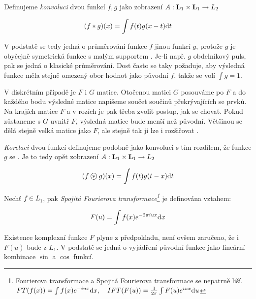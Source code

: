 Definujeme {\em konvoluci} dvou funkcí $f,g$ jako zobrazení $A: \mathbf{L}_1\times\mathbf{L}_1\rightarrow L_2$

\begin{equation}
(f\ast g)(x)=\int f(t)g(x-t){\rm d} t
\end{equation}

V podstatě se tedy jedná o průměrování funkce $f$ jinou funkcí $g$, protože $g$ je obyčejně symetrická funkce s
malým supportem . Je-li např. $g$ obdelníkový puls, pak se jedná o klasické průměrování. Dost 
často se taky požaduje, aby výsledná funkce měla stejně omezený obor hodnot jako původní $f$, takže se volí $\int g=1$.

V diskrétním případě je $F$ i $G$ matice. Otočenou matici $G$ posouváme po $F$ a do každého bodu výsledné matice
napíšeme součet součinů překrývajících se prvků. Na krajích matice $F$ a v rozích je pak třeba zvolit postup, jak se chovat.
Pokud zůstaneme s $G$ uvnitř $F$, výsledná matice bude menší než původní. Většinou se dělá stejně velká matice jako $F$, ale
stejně tak ji lze i rozšiřovat .


{\em Korelaci} dvou funkcí definujeme podobně jako konvoluci s tím rozdílem, že funkce $g$ se . Je to tedy opět zobrazení $A: \mathbf{L}_1\times\mathbf{L}_1\rightarrow L_2$

\begin{equation}
(f\corr g)(x)=\int f(t)g(t-x)\d t
\end{equation}

Nechť $f\in L_1$, pak {\em Spojitá Fourierova transformace\footnote{Fourierova transformace a Spojitá Fourierova transformace se
nepatrně liší.\\$FT(f(x))=\int f(x)e^{-i u x}{\rm d} x,\quad IFT(F(u))=\frac{1}{2\pi}\int F(u)e^{i u x}{\rm d} u$}} je definována vztahem:

\begin{equation}
F(u)=\int f(x)e^{-2\pi i u x}{\rm d} x
\end{equation}

Existence komplexní funkce $F$ plyne z předpokladu, není ovšem zaručeno, že i $F(u)$ bude z $L_1$. 
V podstatě se jedná o vyjádření původní
funkce jako lineární kombinace $\sin$ a $\cos$ funkcí.

